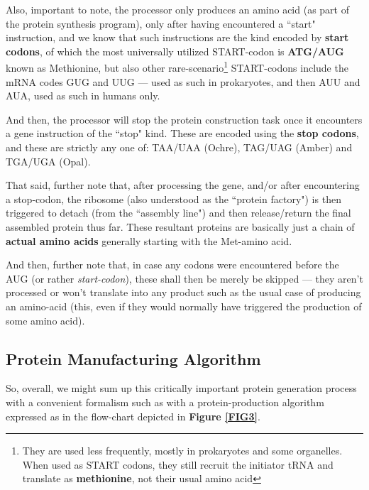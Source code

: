 \documentclass[a4paper, 18pt]{article} %
\begin{document}
Also, important to note, the processor only produces an amino acid (as part of the protein synthesis program), only after having encountered a ``start" instruction, and we know that such instructions are the kind encoded by \textbf{start codons}, of which the most universally utilized START-codon is \textbf{ATG/AUG} known as Methionine, but also other rare-scenario\footnote{They are used less frequently, mostly in prokaryotes and some organelles. When used as START codons, they still recruit the initiator tRNA and translate as \textbf{methionine}, not their usual amino acid\cite{copilot_dna_assistant}} START-codons include the mRNA codes GUG and UUG --- used as such in prokaryotes, and then AUU and AUA, used as such in humans only. 

And then, the processor will stop the protein construction task once it encounters a gene instruction of the ``stop" kind. These are encoded using the \textbf{stop codons}, and these are strictly any one of: TAA/UAA (Ochre), TAG/UAG (Amber) and TGA/UGA (Opal)\cite{newsmedical2025startcodons}.

That said, further note that, after processing the gene, and/or after encountering a stop-codon, the ribosome (also understood as the ``protein factory") is then triggered to detach (from the ``assembly line") and then release/return the final assembled protein thus far. These resultant proteins are basically just a chain of \textbf{actual amino acids} generally starting with the Met-amino acid.

And then, further note that, in case any codons were encountered before the AUG (or rather \textit{start-codon}), these shall then be merely be skipped --- they aren't processed or won't translate into any product such as the usual case of producing an amino-acid (this, even if they would normally have triggered the production of some amino acid). 

\subsection{Protein Manufacturing Algorithm}
\label{SECPROT}

So, overall, we might sum up this critically important protein generation process with a convenient formalism such as with a protein-production algorithm expressed as in the flow-chart depicted in \textbf{Figure \ref{FIG3}}.
\end{document}
